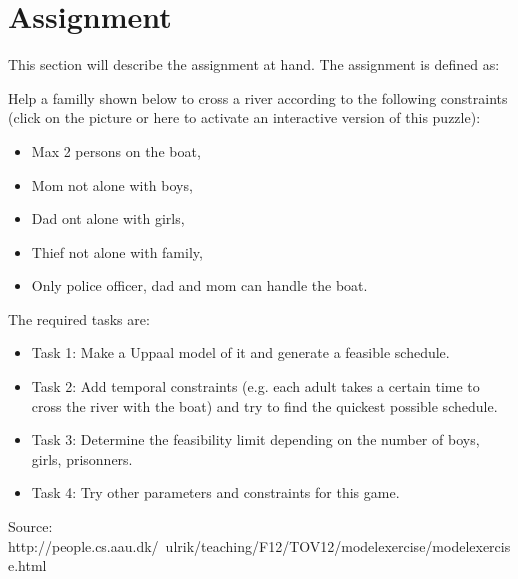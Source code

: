 \section{Assignment}
This section will describe the assignment at hand.
The assignment is defined as:

Help a familly shown below to cross a river according to the following constraints (click on the picture or here to activate an interactive version of this puzzle):

\begin{itemize}
	\item Max 2 persons on the boat,
	\item Mom not alone with boys,
	\item Dad ont alone with girls,
	\item Thief not alone with family,
	\item Only police officer, dad and mom can handle the boat.
\end{itemize}

The required tasks are:

\begin{itemize}
	\item Task 1: Make a Uppaal model of it and generate a feasible schedule.
  \item Task 2: Add temporal constraints (e.g. each adult takes a certain time to cross the river with the boat) and try to find the quickest possible schedule.
  \item Task 3: Determine the feasibility limit depending on the number of boys, girls, prisonners.
  \item Task 4: Try other parameters and constraints for this game.
\end{itemize}

Source: http://people.cs.aau.dk/~ulrik/teaching/F12/TOV12/modelexercise/modelexercise.html